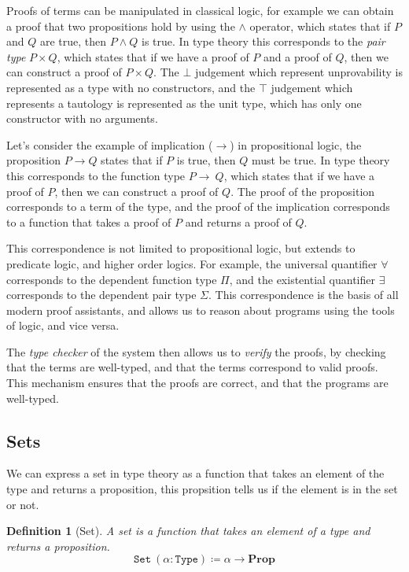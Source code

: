 \documentclass[
  a4paper, 
  10pt, 
  parskip=half, 
  DIV=20,
  toc=bibliography,
  usegeometry,
]{scrartcl}
\newtheorem{definition}[theorem]{Definition}
\renewcommand{\implies}{\rightarrow}
\newcommand{\Prop}{\mathbf{Prop}}
\begin{document}
Proofs of terms can be manipulated in classical logic, for example we can
obtain a proof that two propositions hold by using the \(\land\) operator,
which states that if \(P\) and \(Q\) are true, then \(P \land Q\) is true. In
type theory this corresponds to the \emph{pair type} \(P \times Q\), which
states that if we have a proof of \(P\) and a proof of \(Q\), then we can
construct a proof of \(P \times Q\). The \(\bot\) judgement which 
represent unprovability is represented as a type with no constructors,
and the \(\top\) judgement which represents a tautology is represented as the unit 
type, which has only one constructor with no arguments.

Let's consider the example of implication (\(\implies\)) in propositional
logic, the proposition \(P \implies Q\) states that if \(P\) is true, then \(Q\)
must be true. In type theory this corresponds to the function type
\(P \to \ Q\), which states that if we have a proof of \(P\), then
we can construct a proof of \(Q\). The proof of the proposition corresponds to a
term of the type, and the proof of the implication corresponds to a function
that takes a proof of \(P\) and returns a proof of \(Q\).

This correspondence is not limited to propositional logic, but extends to
predicate logic, and higher order logics. For example, the universal quantifier
\(\forall\) corresponds to the dependent function type \(\Pi\), and the existential
quantifier \(\exists\) corresponds to the dependent pair type \(\Sigma\). This
correspondence is the basis of all modern proof assistants, and allows us to
reason about programs using the tools of logic, and vice versa.

The \emph{type checker} of the system then allows us to \emph{verify} the proofs, by
checking that the terms are well-typed, and that the terms correspond to valid
proofs. This mechanism ensures that the proofs are correct, and that the
programs are well-typed.

\subsection{Sets}\label{sec:sets}

We can express a set in type theory as a function that takes an element of the
type and returns a proposition, this propsition tells us if the element is in
the set or not.

\begin{definition}[Set]
  A set is a function that takes an element of a type and returns a proposition.
  \[
  \texttt{Set} \ (\alpha: \texttt{Type}) \coloneqq \alpha \to \Prop 
  \]
\end{definition}
\end{document}
